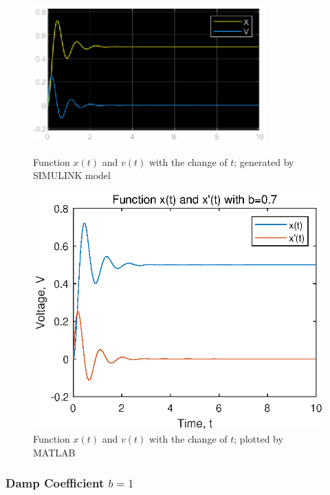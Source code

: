 \begin{figure}[h!]
  \begin{minipage}{0.48\linewidth}
    \centering
    \includegraphics[width=0.8\textwidth]{pics/ex1-b0.7.eps}
    \caption{Function $x(t)$ and $v(t)$ with the change of $t$; generated by 
            SIMULINK model}
    \label{pic-b0.7}
  \end{minipage}
  \begin{minipage}{0.45\linewidth}
    \centering
    \includegraphics[scale=0.6]{pics/ex1-b0.7-plot.eps}
    \caption{Function $x(t)$ and $v(t)$ with the change of $t$; plotted by 
            MATLAB}
    \label{pic-b0.7_2}
    
  \end{minipage}
  
\end{figure}

\subsubsection*{Damp Coefficient $b=1$}

